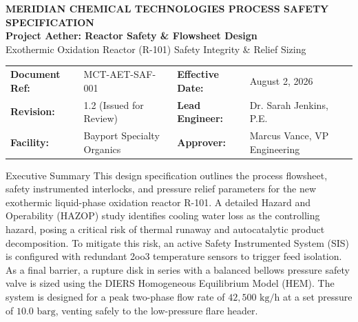 \documentclass[11pt, a4paper]{article}
\begin{document}
\begin{tcolorbox}[
  colback=SafetyNavy,
  colframe=SafetyNavy,
  arc=0mm,
  left=6mm, right=6mm, top=8mm, bottom=8mm,
  width=\textwidth
]
  \color{white}
  \sffamily
  {\large\bfseries MERIDIAN CHEMICAL TECHNOLOGIES \hfill PROCESS SAFETY SPECIFICATION} \\
  \vspace{4mm}
  {\Huge\bfseries Project Aether: Reactor Safety \& Flowsheet Design} \\
  \vspace{2mm}
  {\large Exothermic Oxidation Reactor (R-101) Safety Integrity \& Relief Sizing}
\end{tcolorbox}

\vspace{-2mm}
\begin{tcolorbox}[
  colback=LightBg,
  colframe=MutedGray,
  arc=0mm,
  boxrule=0.5pt,
  left=4mm, right=4mm, top=3mm, bottom=3mm,
  width=\textwidth
]
  \small\sffamily
  \begin{tabularx}{\textwidth}{@{}lXlX@{}}
    \textbf{Document Ref:} & MCT-AET-SAF-001 & \textbf{Effective Date:} & August 2, 2026 \\
    \textbf{Revision:}     & 1.2 (Issued for Review) & \textbf{Lead Engineer:}   & Dr. Sarah Jenkins, P.E. \\
    \textbf{Facility:}     & Bayport Specialty Organics & \textbf{Approver:}       & Marcus Vance, VP Engineering \\
  \end{tabularx}
\end{tcolorbox}

\vspace{1.5em}

\begin{safetyinfo}{Executive Summary}
  This design specification outlines the process flowsheet, safety instrumented interlocks, and pressure relief parameters for the new exothermic liquid-phase oxidation reactor R-101. A detailed Hazard and Operability (HAZOP) study identifies cooling water loss as the controlling hazard, posing a critical risk of thermal runaway and autocatalytic product decomposition. To mitigate this risk, an active Safety Instrumented System (SIS) is configured with redundant 2oo3 temperature sensors to trigger feed isolation. As a final barrier, a rupture disk in series with a balanced bellows pressure safety valve is sized using the DIERS Homogeneous Equilibrium Model (HEM). The system is designed for a peak two-phase flow rate of $42,500\text{ kg/h}$ at a set pressure of $10.0\text{ barg}$, venting safely to the low-pressure flare header.
\end{safetyinfo}

\tableofcontents








\printbibliography
\end{document}

